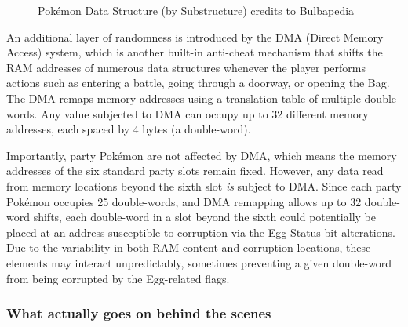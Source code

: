 \documentclass[a4paper]{usiinfbachelorproject}
\begin{document}
\begin{figure}[h!]
	\caption{Pokémon Data Structure (by Substructure) credits to \href{https://bulbapedia.bulbagarden.net/wiki/Pokémon_data_substructures_(Generation_III)}{Bulbapedia}}
	\label{fig:pokemon-data-structure}
\end{figure}



An additional layer of randomness is introduced by the DMA (Direct Memory Access) system, which is another built-in anti-cheat mechanism that shifts the RAM addresses of numerous data structures whenever the player performs actions such as entering a battle, going through a doorway, or opening the Bag. The DMA remaps memory addresses using a translation table of multiple double-words. Any value subjected to DMA can occupy up to 32 different memory addresses, each spaced by 4 bytes (a double-word).

Importantly, party Pokémon are not affected by DMA, which means the memory addresses of the six standard party slots remain fixed. However, any data read from memory locations beyond the sixth slot \textit{is} subject to DMA. Since each party Pokémon occupies 25 double-words, and DMA remapping allows up to 32 double-word shifts, each double-word in a slot beyond the sixth could potentially be placed at an address susceptible to corruption via the Egg Status bit alterations. Due to the variability in both RAM content and corruption locations, these elements may interact unpredictably, sometimes preventing a given double-word from being corrupted by the Egg-related flags.





\subsubsection{\textbf{What actually goes on behind the scenes}}
\end{document}

